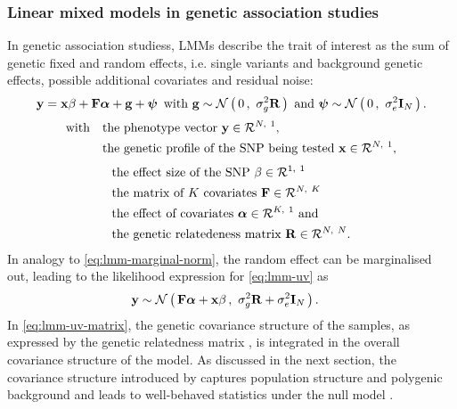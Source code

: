 \subsubsection{Linear mixed models in genetic association studies}
\label{subsection:lmm-genetics}
In genetic association studiess, LMMs describe the trait of interest as the sum of genetic fixed and random effects, i.e. single variants and background genetic effects, possible additional covariates and residual noise: 
%
\begin{equation}
\boldsymbol{\mathbf{y}} =\boldsymbol{\mathbf{x}}\beta + \boldsymbol{\mathbf{F}}\boldsymbol{\mathbf{\alpha}} + \boldsymbol{\mathbf{g}}+\boldsymbol{\mathbf{\psi}} \, \text{ with } \boldsymbol{\mathbf{g}} \sim \mathcal{N}\left(\,{0}\,,~{\sigma_g^2\boldsymbol{\mathbf{R}}}\,\right) \text{ and } \boldsymbol{\mathbf{\psi}} \sim\mathcal{N}\left(\,{0}\,,~{\sigma_e^2\boldsymbol{\mathbf{I}}_N}\,\right).
\label{eq:lmm-uv}
\end{equation}
%
\begin{align*} 
\text{with }\,\,\,\,& \text{the phenotype vector }\boldsymbol{\mathbf{y}} \in \mathcal{R}^{N,~1},\\
& \text{the genetic profile of the SNP being tested }\boldsymbol{\mathbf{x}} \in \mathcal{R}^{N,~1},
\end{align*} %
\begin{align*}
& \text{the effect size of the SNP } \beta \in \mathcal{R}^{1,~1}\\ 
& \text{the matrix of $K$ covariates }\boldsymbol{\mathbf{F}} \in \mathcal{R}^{N,~K}\\ 
& \text{the effect of covariates } \boldsymbol{\mathbf{\alpha}} \in \mathcal{R}^{K,~1} \text{ and}\\
& \text{the genetic relatedeness matrix }\boldsymbol{\mathbf{R}} \in \mathcal{R}^{N,~N}.
\end{align*} 
%
In analogy to \cref{eq:lmm-marginal-norm}, the random effect  can be marginalised out, leading to the likelihood expression for \cref{eq:lmm-uv} as
\begin{align}
\boldsymbol{\mathbf{y}} &\sim \mathcal{N}\left(\,{\boldsymbol{\mathbf{F}}\boldsymbol{\mathbf{\alpha}} +\boldsymbol{\mathbf{x}}\beta}\,,~{\sigma_g^2\boldsymbol{\mathbf{R}} + \sigma_e^2\boldsymbol{\mathbf{I}}_N}\,\right).
\label{eq:lmm-uv-matrix}
\end{align}
%
In \cref{eq:lmm-uv-matrix}, the genetic covariance structure of the samples, as expressed by the genetic relatedness matrix , is integrated in the overall covariance structure of the model. As discussed in the next section, the covariance structure introduced by  captures population structure and polygenic background and leads to well-behaved statistics under the null model \citep{Yu2006,Kang2008}.

